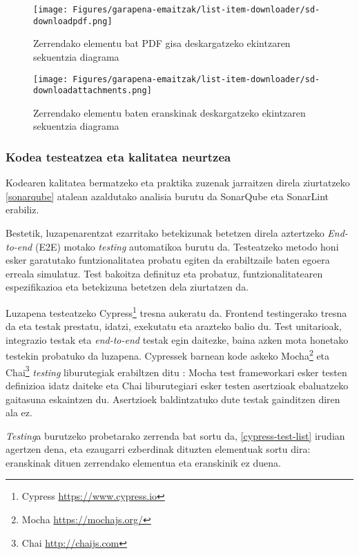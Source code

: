 \newpage
\begin{figure}[H]
\vspace{4.5cm}
\centering
\texttt{[image: Figures/garapena-emaitzak/list-item-downloader/sd-downloadpdf.png]}
\caption{Zerrendako elementu bat PDF gisa deskargatzeko ekintzaren sekuentzia diagrama}
\label{sd-downloadpdf}
\end{figure}

\newpage

\begin{figure}[H]
\centering
\texttt{[image: Figures/garapena-emaitzak/list-item-downloader/sd-downloadattachments.png]}
\caption{Zerrendako elementu baten eranskinak deskargatzeko ekintzaren sekuentzia diagrama}
\label{sd-downloadattachments}
\end{figure}

\subsubsection{Kodea testeatzea eta kalitatea neurtzea}
Kodearen kalitatea bermatzeko eta praktika zuzenak jarraitzen direla ziurtatzeko \ref{sonarqube} atalean azaldutako analisia burutu da SonarQube eta SonarLint erabiliz.

Bestetik, luzapenarentzat ezarritako betekizunak betetzen direla aztertzeko \textit{End-to-end} (E2E) motako \textit{testing} automatikoa burutu da. Testeatzeko metodo honi esker garatutako funtzionalitatea probatu egiten da erabiltzaile baten egoera erreala simulatuz. Test bakoitza definituz eta probatuz, funtzionalitatearen espezifikazioa eta betekizuna betetzen dela ziurtatzen da. 

Luzapena testeatzeko Cypress\footnote{Cypress \url{https://www.cypress.io}} tresna aukeratu da. Frontend testingerako tresna da eta testak prestatu, idatzi, exekutatu eta arazteko balio du. Test unitarioak, integrazio testak eta \textit{end-to-end} testak egin daitezke, baina azken mota honetako testekin probatuko da luzapena. Cypressek barnean kode askeko Mocha\footnote{Mocha \url{https://mochajs.org/}} eta Chai\footnote{Chai \url{http://chaijs.com}} \textit{testing} liburutegiak erabiltzen ditu \cite{cypress-bundled-libraries}: Mocha test frameworkari esker testen definizioa idatz daiteke eta Chai liburutegiari esker testen asertzioak ebaluatzeko gaitasuna eskaintzen du. Asertzioek baldintzatuko dute testak gainditzen diren ala ez.

\textit{Testing}a burutzeko probetarako zerrenda bat sortu da, \ref{cypress-test-list} irudian agertzen dena, eta ezaugarri ezberdinak dituzten elementuak sortu dira: eranskinak dituen zerrendako elementua eta eranskinik ez duena.

